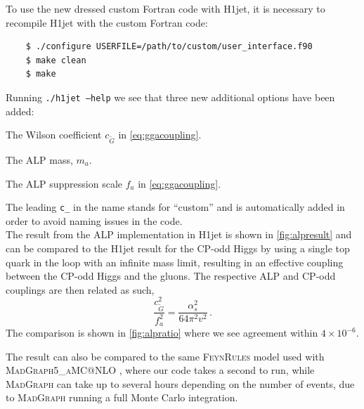 \documentclass[12pt,a4wide]{article}
\begin{document}
To use the new dressed custom Fortran code with H1jet, it is necessary to recompile H1jet with the custom Fortran code: 
\begin{lstlisting}
	$ ./configure USERFILE=/path/to/custom/user_interface.f90 
	$ make clean
	$ make 
\end{lstlisting}
Running \texttt{./h1jet --help} we see that three new additional options have been added: 
\begin{description}[labelindent=\parindent, labelwidth =\widthof{\bfseries9999999999999999999999}, leftmargin = !] 
	\item[\texttt{--c\_CGtil <value>}] The Wilson coefficient $c_{\tilde{G}}$ in \autoref{eq:ggacoupling}. 
	\item[\texttt{--c\_mA <value>}] The ALP mass, $m_a$. 
	\item[\texttt{--c\_fa <value>}] The ALP suppression scale $f_a$ in \autoref{eq:ggacoupling}. 
\end{description}
The leading \texttt{c\_} in the name stands for ``custom'' and is automatically added in order to avoid naming issues in the code. \\ 

The result from the ALP implementation in H1jet is shown in \autoref{fig:alpresult} and can be compared to the H1jet result for the CP-odd Higgs by using a single top quark in the loop with an infinite mass limit, resulting in an effective coupling between the CP-odd Higgs and the gluons. The respective ALP and CP-odd couplings are then related as such, 
\begin{equation}
	\frac{c_{\tilde{G}}^2}{f_a^2} = \frac{\alpha_s^2}{64 \pi^2 v^2} \,. 
\end{equation}
The comparison is shown in \ref{fig:alpratio} where we see agreement within $4\times 10^{-6}$. 

The result can also be compared to the same \textsc{FeynRules} model used with \textsc{MadGraph5\_aMC@NLO} \cite{bib:mg5}, where our code takes a second to run, while \textsc{MadGraph} can take up to several hours depending on the number of events, due to  \textsc{MadGraph} running a full Monte Carlo integration. 
\end{document}
